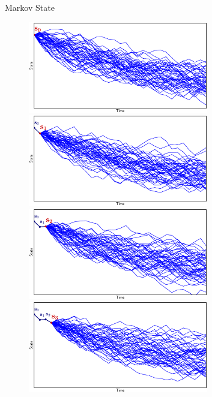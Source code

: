 \documentclass[lecture]{beamer}
\begin{document}
\begin{frame}{\normalsize Markov State}
  \begin{overlayarea}{\textwidth}{0.55\textheight}
    \begin{figure}
    \newcommand{\FS}{0.7}
      \centering
        {%
          \includegraphics[width=\FS\textwidth,clip]{Codes/Basics/Markov0.eps}
        }%
        {%
          \includegraphics[width=\FS\textwidth,clip]{Codes/Basics/Markov1.eps}
        }%
        {%
          \includegraphics[width=\FS\textwidth,clip]{Codes/Basics/Markov2.eps}
        }%
        {%
          \includegraphics[width=\FS\textwidth,clip]{Codes/Basics/Markov3.eps}
}
\end{figure}
\end{overlayarea}
\end{frame}
\end{document}
